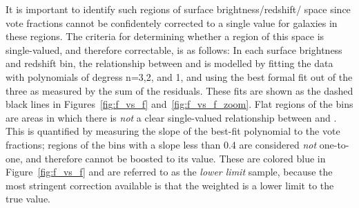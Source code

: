It is important to identify such regions of surface brightness/redshift/\ffeatures{} space since vote fractions cannot be confidentely corrected to a single value for galaxies in these regions. The criteria for determining whether a region of this space is single-valued, and therefore correctable, is as follows: In each surface brightness and redshift bin, the relationship between \ffeaturesz{} and \ffeaturesrest{} is modelled by fitting the data with polynomials of degress n=3,2, and 1, and using the best formal fit out of the three as measured by the sum of the residuals. These fits are shown as the dashed black lines in Figures~\ref{fig:f_vs_f} and~\ref{fig:f_vs_f_zoom}. Flat regions of the bins are areas in which there is \emph{not} a clear single-valued relationship between \ffeaturesz{} and \ffeaturesrest{}. This is quantified by measuring the slope of the best-fit polynomial to the vote fractions; regions of the bins with a slope less than 0.4 are considered \emph{not} one-to-one, and therefore \ffeaturesz{} cannot be boosted to its \ffeaturesrest{} value. These are colored blue in Figure~\ref{fig:f_vs_f} and are referred to as the \textit{lower limit} sample, because the most stringent correction available is that the weighted \ffeatures{} is a lower limit to the true value. 

